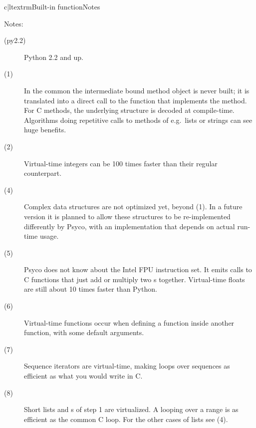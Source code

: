 \documentclass{manual}
\begin{document}
\begin{tableii}{c|l}{textrm}{Built-in function}{Notes}
\end{tableii}

\noindent
Notes:
%
\begin{description}

\item[(py2.2)]
  Python 2.2 and up.
  
\item[(1)]
  In the common  the intermediate bound method object is never built; it is translated into a direct call to the function that implements the method.  For C methods, the underlying  structure is decoded at compile-time.  Algorithms doing repetitive calls to methods of e.g.\ lists or strings can see huge benefits.
  
\item[(2)]
  Virtual-time integers can be 100 times faster than their regular counterpart.

\item[(4)]
  Complex data structures are not optimized yet, beyond (1).  In a future version it is planned to allow these structures to be re-implemented differently by Psyco, with an implementation that depends on actual run-time usage.
  
\item[(5)]
  Psyco does not know about the Intel FPU instruction set.  It emits calls to C functions that just add or multiply two s together.  Virtual-time floats are still about 10 times faster than Python.
  
\item[(6)]
  Virtual-time functions occur when defining a function inside another function, with some default arguments.
  
\item[(7)]
  Sequence iterators are virtual-time, making  loops over sequences as efficient as what you would write in C.

\item[(8)]
  Short lists and s of step 1 are virtualized.  A  looping over a range is as efficient as the common C  loop.  For the other cases of lists see (4).


\end{description}
\end{document}
